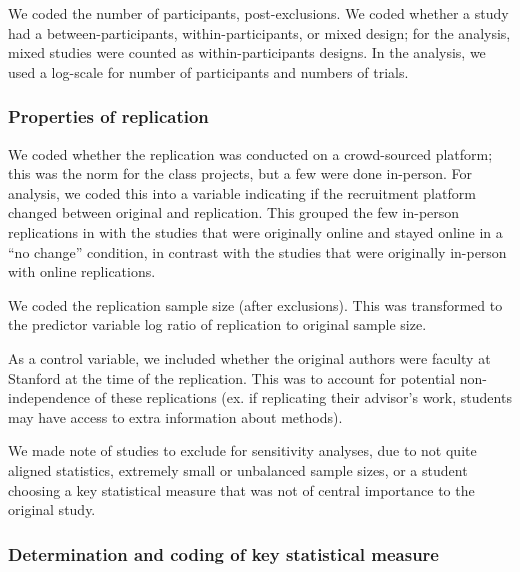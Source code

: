\documentclass[
  english,
  a4paper,
]{article}
\begin{document}
We coded the number of participants, post-exclusions. We coded whether a study had a between-participants, within-participants, or mixed design; for the analysis, mixed studies were counted as within-participants designs. In the analysis, we used a log-scale for number of participants and numbers of trials.

\hypertarget{properties-of-replication}{%
\subsubsection{Properties of replication}\label{properties-of-replication}}

We coded whether the replication was conducted on a crowd-sourced platform; this was the norm for the class projects, but a few were done in-person. For analysis, we coded this into a variable indicating if the recruitment platform changed between original and replication. This grouped the few in-person replications in with the studies that were originally online and stayed online in a ``no change'' condition, in contrast with the studies that were originally in-person with online replications.

We coded the replication sample size (after exclusions). This was transformed to the predictor variable log ratio of replication to original sample size.

As a control variable, we included whether the original authors were faculty at Stanford at the time of the replication. This was to account for potential non-independence of these replications (ex. if replicating their advisor's work, students may have access to extra information about methods).

We made note of studies to exclude for sensitivity analyses, due to not quite aligned statistics, extremely small or unbalanced sample sizes, or a student choosing a key statistical measure that was not of central importance to the original study.

\hypertarget{determination-and-coding-of-key-statistical-measure}{%
\subsubsection{Determination and coding of key statistical measure}\label{determination-and-coding-of-key-statistical-measure}}
\end{document}
